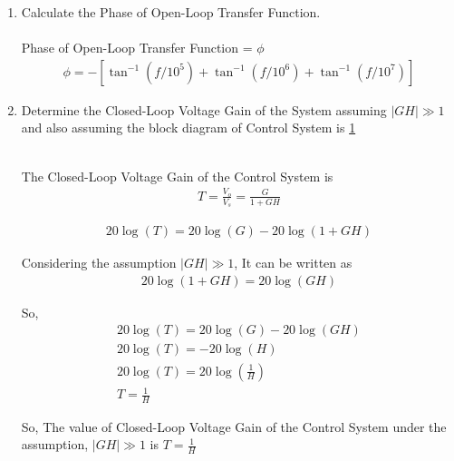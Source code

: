\begin{enumerate}[label=\thesubsection.\arabic*.,ref=\thesubsection.\theenumi]
\item Calculate the Phase of Open-Loop Transfer Function.\\
\solution\\
Phase of Open-Loop Transfer Function = $\phi$
\begin{align}
\phi=-\left[\tan ^{-1}\left(f / 10^{5}\right)+\tan ^{-1}\left(f / 10^{6}\right)+\tan ^{-1}\left(f / 10^{7}\right)\right]
\end{align}

\item Determine the Closed-Loop Voltage Gain of the System assuming $|GH|\gg1$ and also assuming the block diagram of Control System is \ref{fig:Control}
\begin{figure}[ht!]
	\begin{center}
		\resizebox{\columnwidth/1}{!}{}
	\end{center}
	\caption{}
	\label{fig:Control}
\end{figure}

\solution\\
The Closed-Loop Voltage Gain of the Control System is\\
\begin{align}
T = \frac{V_{o}}{V_{s}} = \frac{G}{1+GH}
\end{align}

\begin{align}
20\log(T) = 20\log(G) - 20\log(1+GH)
\end{align}

Considering the assumption $|GH| \gg 1$, It can be written as
\begin{align}
20\log(1+GH) = 20\log(GH)
\end{align}

So,
\begin{align}
20\log(T) = 20\log(G) - 20\log(GH) \\
20\log(T) = -20\log(H) \\
20\log(T)= 20\log(\frac{1}{H})\\
T = \frac{1}{H}
\end{align}

So, The value of Closed-Loop Voltage Gain of the Control System under the assumption, $|GH| \gg 1$ is $T = \frac{1}{H}$\\


\end{enumerate}
